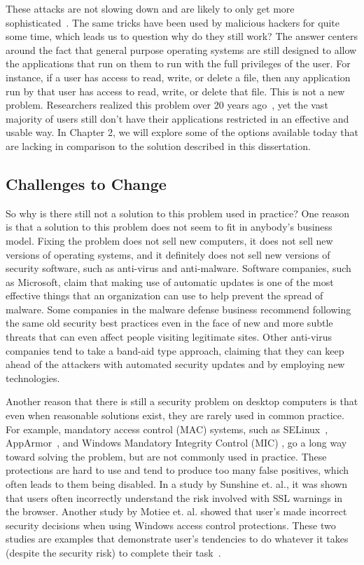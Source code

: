 These attacks are not slowing down and are likely to only get more sophisticated~\cite{wired_2010, damballa_2010,damballa_blog_2010}. The same tricks have been used by malicious hackers for quite some time, which leads us to question why do they still work? The answer centers around the fact that general purpose operating systems are still designed to allow the applications that run on them to run with the full privileges of the user. For instance, if a user has access to read, write, or delete a file, then any application run by that user has access to read, write, or delete that file. This is not a new problem. Researchers realized this problem over 20 years ago~\cite{Lai_88}, yet the vast majority of users still don't have their applications restricted in an effective and usable way. In Chapter 2, we will explore some of the options available today that are lacking in comparison to the solution described in this dissertation.

\subsection{Challenges to Change}

So why is there still not a solution to this problem used in practice? One reason is that a solution to this problem does not seem to fit in anybody's business model. Fixing the problem does not sell new computers, it does not sell new versions of operating systems, and it definitely does not sell new versions of security software, such as anti-virus and anti-malware. Software companies, such as Microsoft, claim that making use of automatic updates is one of the most effective things that an organization can use to help prevent the spread of malware\cite{MS_SIR_2009}. Some companies in the malware defense business recommend following the same old security best practices \cite{cto_roundtable_malware_defense_2010} even in the face of new and more subtle threats that can even affect people visiting legitimate sites\cite{NewYork_Times_2009}. Other anti-virus companies tend to take a band-aid type approach, claiming that they can keep ahead of the attackers with automated security updates and by employing new technologies\cite{Enterprise_IT_Planet_2009}.

Another reason that there is still a security problem on desktop computers is that even when reasonable solutions exist, they are rarely used in common practice. For example, mandatory access control (MAC) systems, such as SELinux~\cite{loscocco_2001}, AppArmor~\cite{AppArmor_2006}, and Windows Mandatory Integrity Control (MIC) \cite{mandatory_integrity_control}, go a long way toward solving the problem, but are not commonly used in practice. These protections are hard to use and tend to produce too many false positives, which often leads to them being disabled. In a study by Sunshine et. al., it was shown that users often incorrectly understand the risk involved with SSL warnings in the browser. Another study by Motiee et. al. showed that user's made incorrect security decisions when using Windows access control protections\cite{motiee_chi_2010}. These two studies are examples that demonstrate user's tendencies to do whatever it takes (despite the security risk) to complete their task~\cite{sunshine_wolf_2009}.


